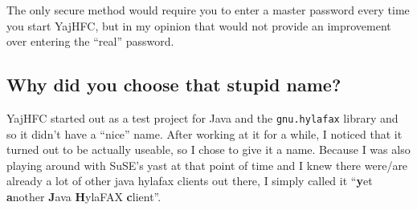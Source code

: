 \documentclass[a4paper,10pt]{scrartcl}
\begin{document}
The only secure method would require you to enter a master password every time
you start YajHFC, but in my opinion that would not provide an improvement over
entering the ``real'' password.


\subsection{Why did you choose that stupid name?}

YajHFC started out as a test project for Java and the \texttt{gnu.hylafax} library and so
it didn't have a ``nice'' name. After working at it for a while, I noticed that it turned 
out to be actually useable, so I chose to give it a name.
Because I was also playing around with SuSE's yast at that point of time and I knew there
were/are already a lot of other java hylafax clients out there, I simply called it
``\textbf{y}et \textbf{a}nother \textbf{J}ava \textbf{H}ylaFAX \textbf{c}lient''. 
\end{document}

